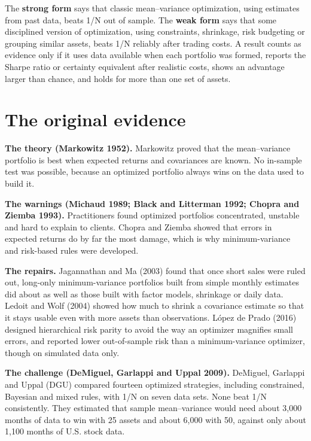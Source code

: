 The \textbf{strong form} says that classic mean--variance optimization, using estimates from past data, beats 1/N out of sample. The \textbf{weak form} says that some disciplined version of optimization, using constraints, shrinkage, risk budgeting or grouping similar assets, beats 1/N reliably after trading costs. A result counts as evidence only if it uses data available when each portfolio was formed, reports the Sharpe ratio or certainty equivalent after realistic costs, shows an advantage larger than chance, and holds for more than one set of assets.

\section{The original evidence}
\label{sec:12-evidence}

\textbf{The theory (Markowitz 1952).} Markowitz proved that the mean--variance portfolio is best when expected returns and covariances are known. No in-sample test was possible, because an optimized portfolio always wins on the data used to build it.

\textbf{The warnings (Michaud 1989; Black and Litterman 1992; Chopra and Ziemba 1993).} Practitioners found optimized portfolios concentrated, unstable and hard to explain to clients. Chopra and Ziemba showed that errors in expected returns do by far the most damage, which is why minimum-variance and risk-based rules were developed.

\textbf{The repairs.} Jagannathan and Ma (2003) found that once short sales were ruled out, long-only minimum-variance portfolios built from simple monthly estimates did about as well as those built with factor models, shrinkage or daily data. Ledoit and Wolf (2004) showed how much to shrink a covariance estimate so that it stays usable even with more assets than observations. L\'opez de Prado (2016) designed hierarchical risk parity to avoid the way an optimizer magnifies small errors, and reported lower out-of-sample risk than a minimum-variance optimizer, though on simulated data only.

\textbf{The challenge (DeMiguel, Garlappi and Uppal 2009).} DeMiguel, Garlappi and Uppal (DGU) compared fourteen optimized strategies, including constrained, Bayesian and mixed rules, with 1/N on seven data sets. None beat 1/N consistently. They estimated that sample mean--variance would need about 3,000 months of data to win with 25 assets and about 6,000 with 50, against only about 1,100 months of U.S. stock data.


